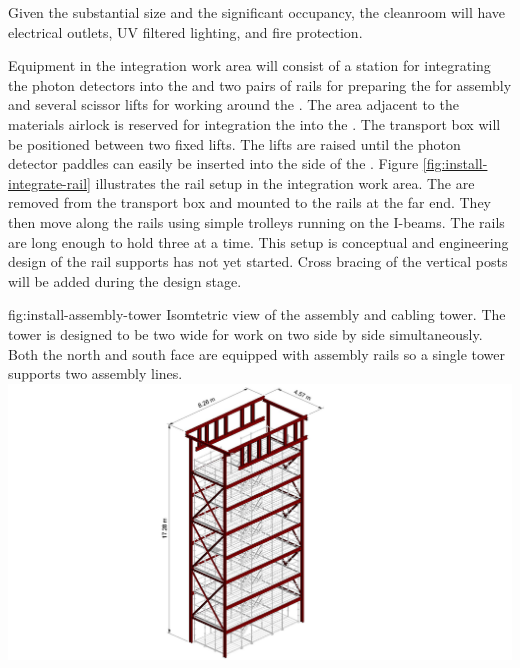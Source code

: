 Given the substantial size and the significant occupancy, the cleanroom will have electrical outlets, UV filtered lighting, and fire protection.

Equipment in the integration work area will consist of a station for integrating the photon detectors into the  and two pairs of rails for preparing the  for assembly and several scissor lifts for working around the . 
The area adjacent to the materials airlock is reserved for integration the  into the . 
The  transport box will be positioned between two fixed lifts. 
The lifts are raised until the photon detector paddles can easily be inserted into the side of the .
Figure \ref{fig:install-integrate-rail} illustrates the rail setup in the integration work area. 
The  are removed from the transport box and mounted to the rails at the far end. 
They then move along the rails using simple trolleys running on the I-beams. 
The rails are long enough to hold three  at a time. 
This setup is conceptual and engineering design of the rail supports has not yet started. 
Cross bracing of the vertical posts will be added during the design stage. 

\begin{dunefigure}{fig:install-assembly-tower}
  {
  Isomtetric view of the  assembly and cabling tower. 
  The tower is designed to be two  wide for work on two  side by side simultaneously. 
  Both the north and south face are equipped with assembly rails so a single tower supports two assembly lines.
  }
\includegraphics[width=.5\textwidth]{graphics/install-assembly-tower.pdf}
\end{dunefigure}


